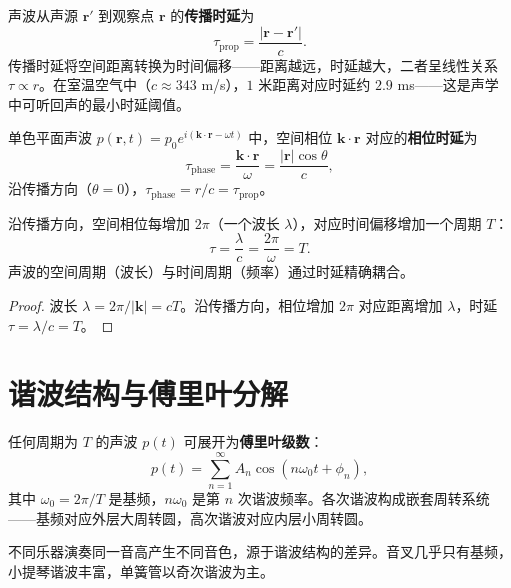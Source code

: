 \begin{definition}[声波的传播时延]\label{def:acoustic_propagation_delay}
声波从声源 $\mathbf{r}'$ 到观察点 $\mathbf{r}$ 的\textbf{传播时延}为
\[
\tau_{\text{prop}} = \frac{|\mathbf{r} - \mathbf{r}'|}{c}.
\]
传播时延将空间距离转换为时间偏移——距离越远，时延越大，二者呈线性关系 $\tau \propto r$。在室温空气中（$c \approx 343$ m/s），$1$ 米距离对应时延约 $2.9$ ms——这是声学中可听回声的最小时延阈值。
\end{definition}

\begin{definition}[声波的相位时延]\label{def:acoustic_phase_delay}
单色平面声波 $p(\mathbf{r}, t) = p_0 e^{i(\mathbf{k}\cdot\mathbf{r} - \omega t)}$ 中，空间相位 $\mathbf{k}\cdot\mathbf{r}$ 对应的\textbf{相位时延}为
\[
\tau_{\text{phase}} = \frac{\mathbf{k}\cdot\mathbf{r}}{\omega} = \frac{|\mathbf{r}|\cos\theta}{c},
\]
沿传播方向（$\theta=0$），$\tau_{\text{phase}} = r/c = \tau_{\text{prop}}$。
\end{definition}

\begin{proposition}[声波时延与相位的统一]\label{prop:acoustic_delay_phase_unity}
沿传播方向，空间相位每增加 $2\pi$（一个波长 $\lambda$），对应时间偏移增加一个周期 $T$：
\[
\tau = \frac{\lambda}{c} = \frac{2\pi}{\omega} = T.
\]
声波的空间周期（波长）与时间周期（频率）通过时延精确耦合。
\end{proposition}

\begin{proof}
波长 $\lambda = 2\pi/|\mathbf{k}| = cT$。沿传播方向，相位增加 $2\pi$ 对应距离增加 $\lambda$，时延 $\tau = \lambda/c = T$。
\end{proof}

\section{谐波结构与傅里叶分解}

\begin{definition}[谐波级数]\label{def:harmonic_series}
任何周期为 $T$ 的声波 $p(t)$ 可展开为\textbf{傅里叶级数}：
\[
p(t) = \sum_{n=1}^{\infty} A_n \cos(n\omega_0 t + \phi_n),
\]
其中 $\omega_0 = 2\pi/T$ 是基频，$n\omega_0$ 是第 $n$ 次谐波频率。各次谐波构成嵌套周转系统——基频对应外层大周转圆，高次谐波对应内层小周转圆。
\end{definition}

\begin{example}[乐器音色的谐波特征]\label{ex:instrument_timbre}
不同乐器演奏同一音高产生不同音色，源于谐波结构的差异。音叉几乎只有基频，小提琴谐波丰富，单簧管以奇次谐波为主。
\end{example}

